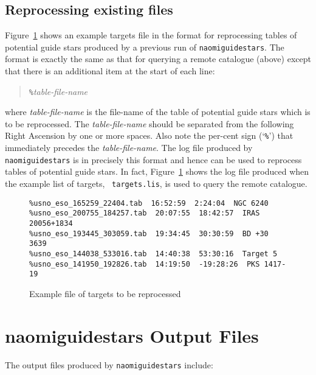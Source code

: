 \documentclass[twoside,11pt]{article}
\newcommand{\xlabel}[1]{}
\renewcommand{\_}{\texttt{\symbol{95}}}
\begin{document}
\subsection{\label{REPROC_R}Reprocessing existing files}

Figure~\ref{RTARGETS} shows an example targets file in the format for
reprocessing tables of potential guide stars produced by a previous
run of {\tt naomiguidestars}.  The format is exactly the same as that for
querying a remote catalogue (above) except that there is an additional
item at the start of each line:

\begin{quote}
{\tt \%}{\it table-file-name}
\end {quote}

where {\it table-file-name}\/ is the file-name of the table of potential
guide stars which is to be reprocessed.  The {\it table-file-name}\/
should be separated from the following Right Ascension by one or more
spaces.  Also note the per-cent sign (`{\tt \%}') that immediately
precedes the {\it table-file-name}.  The log file produced by {\tt
naomiguidestars} is in precisely this format and hence can be used to
reprocess tables of potential guide stars.  In fact, Figure~\ref{RTARGETS}
shows the log file produced when the example list of targets, {\tt
targets.lis}, is used to query the remote catalogue.

\begin{center}
\begin{figure}[htbp]

\begin{verbatim}
%usno_eso_165259_22404.tab  16:52:59  2:24:04  NGC 6240
%usno_eso_200755_184257.tab  20:07:55  18:42:57  IRAS 20056+1834
%usno_eso_193445_303059.tab  19:34:45  30:30:59  BD +30 3639
%usno_eso_144038_533016.tab  14:40:38  53:30:16  Target 5
%usno_eso_141950_192826.tab  14:19:50  -19:28:26  PKS 1417-19
\end{verbatim}

\caption{Example file of targets to be reprocessed \label{RTARGETS} }

\end{figure}
\end{center}


\section{\xlabel{OUTFILE}\label{OUTFILE}naomiguidestars Output Files}

The output files produced by {\tt naomiguidestars} include:
\end{document}
